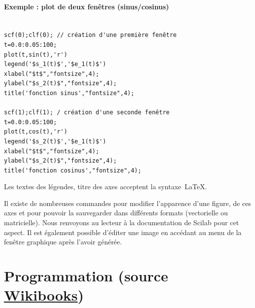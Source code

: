 \paragraph{Exemple : plot de deux fenêtres (sinus/cosinus)}
\begin{code}
\begin{verbatim}

scf(0);clf(0); // création d'une première fenêtre
t=0.0:0.05:100;
plot(t,sin(t),'r')
legend('$s_1(t)$','$e_1(t)$')
xlabel("$t$","fontsize",4);
ylabel("$s_2(t)$","fontsize",4);
title('fonction sinus',"fontsize",4);

scf(1);clf(1); / création d'une seconde fenêtre
t=0.0:0.05:100;
plot(t,cos(t),'r')
legend('$s_2(t)$','$e_1(t)$')
xlabel("$t$","fontsize",4);
ylabel("$s_2(t)$","fontsize",4);
title('fonction cosinus',"fontsize",4);
\end{verbatim}
\end{code}
          
Les textes des légendes, titre des axes acceptent la syntaxe~\LaTeX.

Il existe de nombreuses commandes pour modifier l'apparence
d'une figure, de ces axes et pour pouvoir la sauvegarder
dans différents formats (vectorielle ou matricielle).
Nous renvoyons au lecteur à la documentation de Scilab pour
cet aspect. Il est également possible d'éditer une image en accédant
au menu de la fenêtre graphique après l'avoir générée.


\section[Programmation]
        {Programmation (source 
        \href{https://fr.wikibooks.org/wiki/Découvrir_Scilab}{Wikibooks}) }

